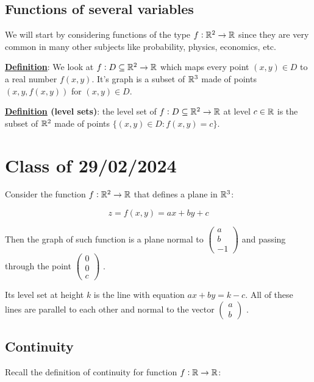 \documentclass[10pt]{extarticle}
\begin{document}
\subsection{Functions of several variables}

We will start by considering functions of the type $f: \mathbb{R}^2 \to \mathbb{R}$ since they are very common in many other subjects like probability, physics, economics, etc.

\textbf{\underline{Definition}}: We look at $f: D \subseteq \mathbb{R}^2 \to \mathbb{R}$ which maps every point $(x, y) \in D$ to a real number $f(x, y)$.
It's graph is a subset of $\mathbb{R}^3$ made of points $(x, y, f(x, y))$ for $(x, y) \in D$.

\textbf{\underline{Definition} (level sets)}: the level set of $f: D \subseteq \mathbb{R}^2 \to \mathbb{R}$ at level $c \in \mathbb{R}$ is the subset of $\mathbb{R}^2$ made of points $\{ (x, y) \in D : f(x, y) = c \}$.

\section{Class of 29/02/2024}

Consider the function $f: \mathbb{R}^2 \to \mathbb{R}$ that defines a plane in $\mathbb{R}^3$:

$$
    z = f(x, y) = ax + by + c
$$

Then the graph of such function is a plane normal to
$\begin{pmatrix}
        a \\ b \\ -1
    \end{pmatrix}$
and passing through the point
$\begin{pmatrix}
        0 \\ 0 \\ c
    \end{pmatrix}$
.

Its level set at height $k$ is the line with equation $ax + by = k - c$. All of these lines are parallel to each other and normal to the vector
$\begin{pmatrix}
        a \\ b
    \end{pmatrix}$
.


\subsection{Continuity}

Recall the definition of continuity for function $f: \mathbb{R} \to \mathbb{R}$:
\end{document}
